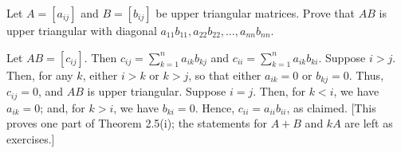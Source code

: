Let $A=\left[a_{i j}\right]$ and $B=\left[b_{i j}\right]$ be upper triangular matrices. Prove that $A B$ is upper triangular with diagonal $a_{11} b_{11}, a_{22} b_{22}, \ldots, a_{n n} b_{n n}$.

Let $A B=\left[c_{i j}\right]$. Then $c_{i j}=\sum_{k=1}^{n} a_{i k} b_{k j}$ and $c_{i i}=\sum_{k=1}^{n} a_{i k} b_{k i}$. Suppose $i>j$. Then, for any $k$, either $i>k$ or $k>j$, so that either $a_{i k}=0$ or $b_{k j}=0$. Thus, $c_{i j}=0$, and $A B$ is upper triangular. Suppose $i=j$. Then, for $k<i$, we have $a_{i k}=0$; and, for $k>i$, we have $b_{k i}=0$. Hence, $c_{i i}=a_{i i} b_{i i}$, as claimed. [This proves one part of Theorem 2.5(i); the statements for $A+B$ and $k A$ are left as exercises.]